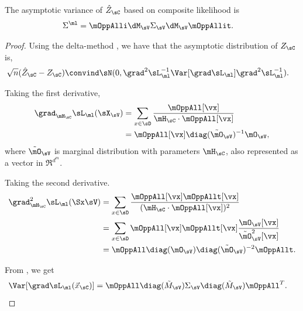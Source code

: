 \begin{lemma}
  \label{lem:pw-variance}
  The asymptotic variance of $\hat Z_{\sC}$ based on composite likelihood is
  \begin{align*}
    \Sigma^{\ml} &= \mOppAlli \dM_\sV \Sigma_\sV \dM_\sV \mOppAllit.
  \end{align*}
\end{lemma}
\begin{proof}
  Using the delta-method \cite{vaart98asymptotic}, we have that the
  asymptotic distribution of $Z_\sC$ is,
  \begin{align*}
    \sqrt{n}(\hat Z_{\sC} - Z_{\sC}) &\convind \sN( 0, \grad^2 \sL_\ml^{-1} \Var[\grad \sL_\ml] \grad^2 \sL_\ml^{-1}).
  \end{align*}

Taking the first derivative,
\begin{align}
  \grad_{\mH_\sC} \sL_\ml(\sX_\sV) 
  &= \sum_{x \in \sD} \frac{\mOppAll[\vx]}{\mH_\sC \cdot \mOppAll[\vx]} \nonumber \\ 
  &= \mOppAll[\vx] \diag(\tilde \mO_{\sV})^{-1} \mO_{\sV}, \label{eqn:lhood-grad}
\end{align}
where $\tilde \mO_\sV$ is marginal distribution with parameters $\mH_\sC$, also represented as a vector in $\Re^{d^m}$.

Taking the second derivative.
\begin{align}
  \grad^2_{\mH_\sC} \sL_\ml(\Sx \sV) 
  &= \sum_{x \in \sD} \frac{\mOppAll[\vx] \mOppAllt[\vx]}{(\mH_\sC \cdot \mOppAll[\vx])^2} \nonumber \\
  &= \sum_{x \in \sD}\mOppAll[\vx] \mOppAllt[\vx] \frac{\mO_{\sV}[\vx]}{\tilde \mO_{\sV}^2[\vx]} \nonumber \\
  &= \mOppAll \diag(\mO_{\sV}) \diag(\tilde \mO_{\sV})^{-2} \mOppAllt. \label{eqn:lhood-hess}%
\end{align}



  From , we get
  \begin{align*}
    \Var [\grad \sL_\ml(\vec x_\sC)] &= \mOppAll \diag(\tilde M_\sV) \Sigma_\sV \diag(\tilde M_\sV) \mOppAll^T .
  \end{align*}


\end{proof}

